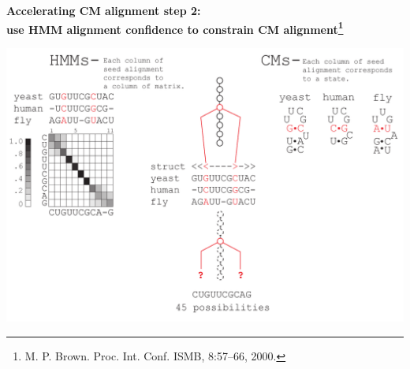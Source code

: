 \documentclass[landscape]{slides}
\begin{document}
\begin{slide}
\begin{center}

\textbf{Accelerating CM alignment step 2: \\ use HMM alignment
  confidence to constrain CM alignment\footnote{M. P. Brown. Proc. Int. Conf. ISMB, 8:57–66, 2000.}}
\end{center}
\medskip
\small
\begin{center}
\includegraphics[width=8in]{figs/post_hmm_to_cm_map2_layer14}
\end{center}
\vfill
\end{slide}
\end{document}
